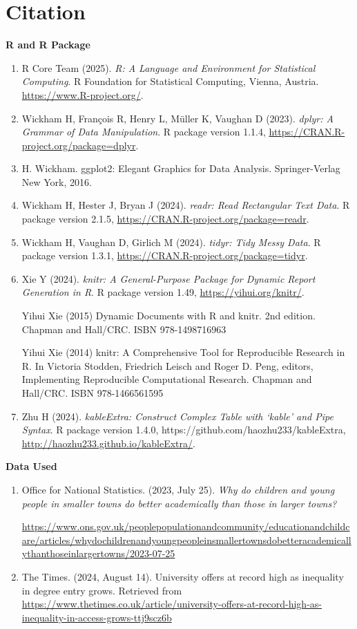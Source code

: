 \documentclass[11pt,en]{../resources/elegantpaper}
\begin{document}
\section{Citation}\label{citation}

\textbf{R and R Package}

\begin{enumerate}
\def\labelenumi{\arabic{enumi}.}
\item
  R Core Team (2025). \emph{R: A Language and Environment for
  Statistical Computing}. R Foundation for Statistical Computing,
  Vienna, Austria. \url{https://www.R-project.org/}.
\item
  Wickham H, François R, Henry L, Müller K, Vaughan D (2023).
  \emph{dplyr: A Grammar of Data Manipulation}. R package version 1.1.4,
  \url{https://CRAN.R-project.org/package=dplyr}.
\item
  H. Wickham. ggplot2: Elegant Graphics for Data Analysis.
  Springer-Verlag New York, 2016.
\item
  Wickham H, Hester J, Bryan J (2024). \emph{readr: Read Rectangular
  Text Data}. R package version 2.1.5,
  \url{https://CRAN.R-project.org/package=readr}.
\item
  Wickham H, Vaughan D, Girlich M (2024). \emph{tidyr: Tidy Messy Data}.
  R package version 1.3.1,
  \url{https://CRAN.R-project.org/package=tidyr}.
\item
  Xie Y (2024). \emph{knitr: A General-Purpose Package for Dynamic
  Report Generation in R}. R package version 1.49,
  \url{https://yihui.org/knitr/}.

  Yihui Xie (2015) Dynamic Documents with R and knitr. 2nd edition.
  Chapman and Hall/CRC. ISBN 978-1498716963

  Yihui Xie (2014) knitr: A Comprehensive Tool for Reproducible Research
  in R. In Victoria Stodden, Friedrich Leisch and Roger D. Peng,
  editors, Implementing Reproducible Computational Research. Chapman and
  Hall/CRC. ISBN 978-1466561595
\item
  Zhu H (2024). \emph{kableExtra: Construct Complex Table with `kable'
  and Pipe Syntax}. R package version 1.4.0,
  https://github.com/haozhu233/kableExtra,
  \url{http://haozhu233.github.io/kableExtra/}.
\end{enumerate}

\textbf{Data Used}

\begin{enumerate}
\def\labelenumi{\arabic{enumi}.}
\item
  Office for National Statistics. (2023, July 25). \emph{Why do children
  and young people in smaller towns do better academically than those in
  larger towns?}

  \url{https://www.ons.gov.uk/peoplepopulationandcommunity/educationandchildcare/articles/whydochildrenandyoungpeopleinsmallertownsdobetteracademicallythanthoseinlargertowns/2023-07-25}
\item
  The Times. (2024, August 14). University offers at record high as
  inequality in degree entry grows. Retrieved from
  \url{https://www.thetimes.co.uk/article/university-offers-at-record-high-as-inequality-in-access-grows-ttj9scz6b}
\end{enumerate}
\end{document}
